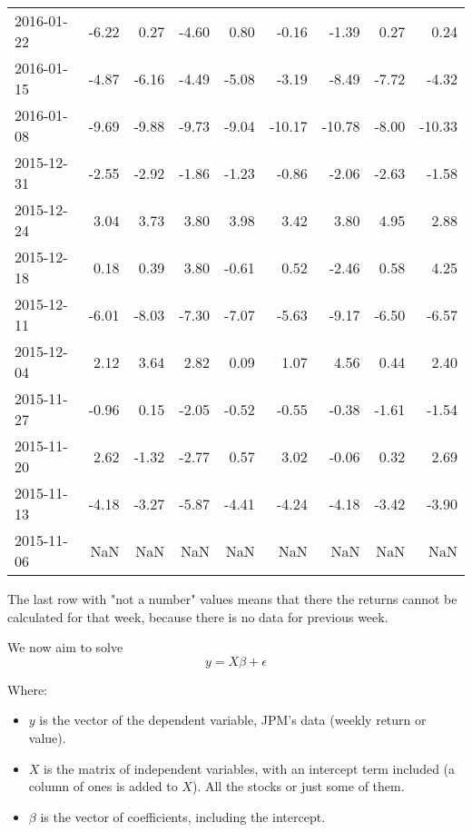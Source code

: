 \documentclass{article}
\begin{document}
{\begin{tabular}{lrrrrrrrr}
        2016-01-22 & -6.22 & 0.27   & -4.60  & 0.80  & -0.16  & -1.39  & 0.27   & 0.24   \\
        2016-01-15 & -4.87 & -6.16  & -4.49  & -5.08 & -3.19  & -8.49  & -7.72  & -4.32  \\
        2016-01-08 & -9.69 & -9.88  & -9.73  & -9.04 & -10.17 & -10.78 & -8.00  & -10.33 \\
        2015-12-31 & -2.55 & -2.92  & -1.86  & -1.23 & -0.86  & -2.06  & -2.63  & -1.58  \\
        2015-12-24 & 3.04  & 3.73   & 3.80   & 3.98  & 3.42   & 3.80   & 4.95   & 2.88   \\
        2015-12-18 & 0.18  & 0.39   & 3.80   & -0.61 & 0.52   & -2.46  & 0.58   & 4.25   \\
        2015-12-11 & -6.01 & -8.03  & -7.30  & -7.07 & -5.63  & -9.17  & -6.50  & -6.57  \\
        2015-12-04 & 2.12  & 3.64   & 2.82   & 0.09  & 1.07   & 4.56   & 0.44   & 2.40   \\
        2015-11-27 & -0.96 & 0.15   & -2.05  & -0.52 & -0.55  & -0.38  & -1.61  & -1.54  \\
        2015-11-20 & 2.62  & -1.32  & -2.77  & 0.57  & 3.02   & -0.06  & 0.32   & 2.69   \\
        2015-11-13 & -4.18 & -3.27  & -5.87  & -4.41 & -4.24  & -4.18  & -3.42  & -3.90  \\
        2015-11-06 & NaN   & NaN    & NaN    & NaN   & NaN    & NaN    & NaN    & NaN    \\
        \bottomrule
    \end{tabular}
}

The last row with "not a number" values means that
there the returns cannot be calculated for that week,
because there is no data for previous week.

We now aim to solve
\[
    y = X\beta + \epsilon
\]

Where:
\begin{itemize}
    \item \( y \) is the vector of the dependent variable, JPM's data (weekly return or value).
    \item \( X \) is the matrix of independent variables, with an intercept term included (a column of ones is added to \( X \)). All the stocks or just some of them.
    \item \( \beta \) is the vector of coefficients, including the intercept.
\end{itemize}
\end{document}
